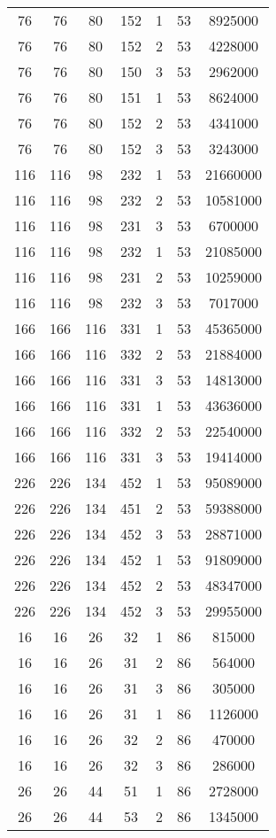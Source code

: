 \documentclass[a4paper,11pt]{article}
\begin{document}
\begin{longtable}{ |c|c|c|c|c|c|c| }
76 & 76 & 80 & 152 & 1 & 53 & 8925000 \\
76 & 76 & 80 & 152 & 2 & 53 & 4228000 \\
76 & 76 & 80 & 150 & 3 & 53 & 2962000 \\
76 & 76 & 80 & 151 & 1 & 53 & 8624000 \\
76 & 76 & 80 & 152 & 2 & 53 & 4341000 \\
76 & 76 & 80 & 152 & 3 & 53 & 3243000 \\
116 & 116 & 98 & 232 & 1 & 53 & 21660000 \\
116 & 116 & 98 & 232 & 2 & 53 & 10581000 \\
116 & 116 & 98 & 231 & 3 & 53 & 6700000 \\
116 & 116 & 98 & 232 & 1 & 53 & 21085000 \\
116 & 116 & 98 & 231 & 2 & 53 & 10259000 \\
116 & 116 & 98 & 232 & 3 & 53 & 7017000 \\
166 & 166 & 116 & 331 & 1 & 53 & 45365000 \\
166 & 166 & 116 & 332 & 2 & 53 & 21884000 \\
166 & 166 & 116 & 331 & 3 & 53 & 14813000 \\
166 & 166 & 116 & 331 & 1 & 53 & 43636000 \\
166 & 166 & 116 & 332 & 2 & 53 & 22540000 \\
166 & 166 & 116 & 331 & 3 & 53 & 19414000 \\
226 & 226 & 134 & 452 & 1 & 53 & 95089000 \\
226 & 226 & 134 & 451 & 2 & 53 & 59388000 \\
226 & 226 & 134 & 452 & 3 & 53 & 28871000 \\
226 & 226 & 134 & 452 & 1 & 53 & 91809000 \\
226 & 226 & 134 & 452 & 2 & 53 & 48347000 \\
226 & 226 & 134 & 452 & 3 & 53 & 29955000 \\
16 & 16 & 26 & 32 & 1 & 86 & 815000 \\
16 & 16 & 26 & 31 & 2 & 86 & 564000 \\
16 & 16 & 26 & 31 & 3 & 86 & 305000 \\
16 & 16 & 26 & 31 & 1 & 86 & 1126000 \\
16 & 16 & 26 & 32 & 2 & 86 & 470000 \\
16 & 16 & 26 & 32 & 3 & 86 & 286000 \\
26 & 26 & 44 & 51 & 1 & 86 & 2728000 \\
26 & 26 & 44 & 53 & 2 & 86 & 1345000 \\

\end{longtable}
\end{document}
